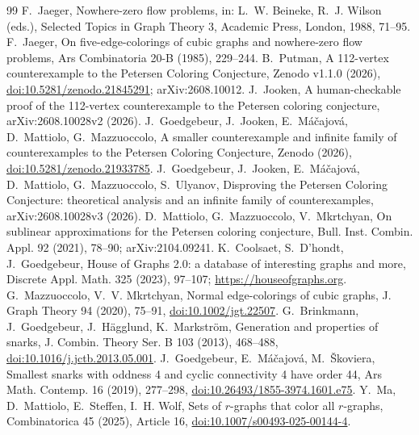 \documentclass[11pt]{article}
\theoremstyle{definition}
\theoremstyle{remark}
\begin{document}
\begin{thebibliography}{99}
 F.~Jaeger, Nowhere-zero flow problems, in: L.~W. Beineke, R.~J. Wilson
(eds.), Selected Topics in Graph Theory 3, Academic Press, London, 1988, 71--95.
 F.~Jaeger, On five-edge-colorings of cubic graphs and nowhere-zero flow
problems, Ars Combinatoria 20-B (1985), 229--244.
 B.~Putman, A 112-vertex counterexample to the Petersen Coloring Conjecture,
Zenodo v1.1.0 (2026), \href{https://doi.org/10.5281/zenodo.21845291}{doi:10.5281/zenodo.21845291};
arXiv:2608.10012.
 J.~Jooken, A human-checkable proof of the 112-vertex counterexample to the
Petersen coloring conjecture, arXiv:2608.10028v2 (2026).
 J.~Goedgebeur, J.~Jooken, E.~M\'a\v{c}ajov\'a, D.~Mattiolo, G.~Mazzuoccolo,
A smaller counterexample and infinite family of counterexamples to the Petersen Coloring
Conjecture, Zenodo (2026), \href{https://doi.org/10.5281/zenodo.21933785}{doi:10.5281/zenodo.21933785}.
 J.~Goedgebeur, J.~Jooken, E.~M\'a\v{c}ajov\'a, D.~Mattiolo, G.~Mazzuoccolo,
S.~Ulyanov, Disproving the Petersen Coloring Conjecture: theoretical analysis and an infinite
family of counterexamples, arXiv:2608.10028v3 (2026).
 D.~Mattiolo, G.~Mazzuoccolo, V.~Mkrtchyan, On sublinear approximations for the
Petersen coloring conjecture, Bull. Inst. Combin. Appl. 92 (2021), 78--90; arXiv:2104.09241.
 K.~Coolsaet, S.~D'hondt, J.~Goedgebeur, House of Graphs 2.0: a database of
interesting graphs and more, Discrete Appl. Math. 325 (2023), 97--107;
\url{https://houseofgraphs.org}.
 G.~Mazzuoccolo, V.~V. Mkrtchyan, Normal edge-colorings of cubic graphs,
J. Graph Theory 94 (2020), 75--91, \href{https://doi.org/10.1002/jgt.22507}{doi:10.1002/jgt.22507}.
 G.~Brinkmann, J.~Goedgebeur, J.~H\"agglund, K.~Markstr\"om, Generation and
properties of snarks, J. Combin. Theory Ser. B 103 (2013), 468--488,
\href{https://doi.org/10.1016/j.jctb.2013.05.001}{doi:10.1016/j.jctb.2013.05.001}.
 J.~Goedgebeur, E.~M\'a\v{c}ajov\'a, M.~\v{S}koviera, Smallest snarks with oddness
4 and cyclic connectivity 4 have order 44, Ars Math. Contemp. 16 (2019), 277--298,
\href{https://doi.org/10.26493/1855-3974.1601.e75}{doi:10.26493/1855-3974.1601.e75}.
 Y.~Ma, D.~Mattiolo, E.~Steffen, I.~H. Wolf, Sets of $r$-graphs that color all
$r$-graphs, Combinatorica 45 (2025), Article 16,
\href{https://doi.org/10.1007/s00493-025-00144-4}{doi:10.1007/s00493-025-00144-4}.
\end{thebibliography}
\end{document}
